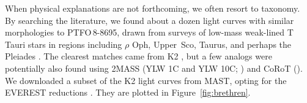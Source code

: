 \documentclass[12pt,twocolumn,tighten]{aastex62}
\newcommand{\ptfo}{PTFO$\,$8-8695}
\begin{document}
 When physical explanations are not
forthcoming, we often resort to taxonomy.  By searching the
literature, we found about a dozen light curves with similar
morphologies to \ptfo, drawn from surveys of low-mass weak-lined T
Tauri stars in regions including $\rho$ Oph, Upper~Sco, Taurus, and
perhaps the Pleiades
\citep{parks_periodic_2014,rebull_rotation_2016,david_transient_2017,stauffer_orbiting_2017,stauffer_rotevol_2018,rebull_usco_2018,rebull_rotation_2020}.
The clearest matches came from K2 \citep{howell_k2_2014}, but a few
analogs were potentially also found using 2MASS (YLW 1C and YLW 10C;
\citealt{parks_periodic_2014}) and CoRoT
(\citealt{stauffer_csi_2015}).  We downloaded a subset of the K2 light
curves from MAST, opting for the EVEREST reductions
\citep{luger_everest_2016,luger_update_2018}.  They are plotted in
Figure~\ref{fig:brethren}.
\end{document}
